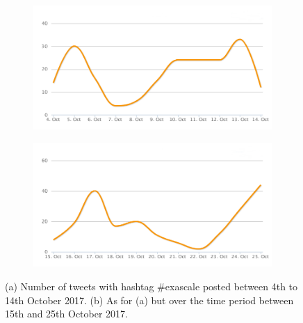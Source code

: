 \begin{figure}
 \centering
 \begin{subfigure}[b]{0.9\textwidth}
   \includegraphics[width=1\linewidth]{Images/FirstSearch_Exascale.png}
   \caption{} 
 \end{subfigure}

 \begin{subfigure}[b]{0.9\textwidth}
   \includegraphics[width=1\linewidth]{Images/SecondSearch_Exascale.png}
   \caption{}
 \end{subfigure}
 \caption{(a) Number of tweets with hashtag \#exascale posted between 4th to 14th October 2017. (b) As for (a) but over the time period between 15th and 25th October 2017.} 
 \label{First-SecondSearch_Exascale}
\end{figure}